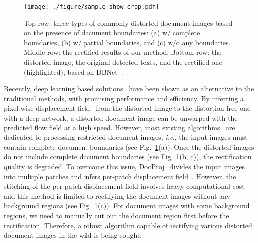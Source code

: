 \documentclass[lettersize,journal]{IEEEtran}
\begin{document}
\begin{figure}[t]
  \centering
  \texttt{[image: ./figure/sample\_show-crop.pdf]}
  \caption{Top row: three types of commonly distorted document images based on the presence of document boundaries: (a) w/ complete boundaries, (b) w/ partial boundaries, and (c) w/o any boundaries. Middle row: the rectified results of our method. Bottom row: the distorted image, the original detected texts, and the rectified one (highlighted), based on DBNet~\cite{liao2020real,CnSTD2023}.}
  \label{fig:doc_class}
  \vspace{-0.04in}
\end{figure}

Recently, deep learning based solutions~\cite{das2020intrinsic,9010747,das2021end,feng2021doctr,jiang2022revisiting,liu2020geometric,8578592,xie2021document,xie2020dewarping,xue2022fourier,feng2021docscanner,feng2022geometric,markovitz2020can,ma2022learning,zhang2022marior,li2019document} have been shown as an alternative to the traditional methods, with promising performance and efficiency.
By inferring a pixel-wise displacement field~\cite{teed2020raft} from the distorted image to the distortion-free one with a deep network, a distorted document image can be unwarped with the predicted flow field at a high speed.
However, most existing algorithms~\cite{das2020intrinsic,9010747,das2021end,feng2021doctr,jiang2022revisiting,liu2020geometric,8578592,xie2021document,xie2020dewarping,xue2022fourier,feng2021docscanner,feng2022geometric,markovitz2020can,zhang2022marior,ma2022learning} are dedicated to processing restricted document images, \emph{i.e.}, the input images must contain complete document boundaries (see Fig.~\ref{fig:doc_class}(a)). 
Once the distorted images do not include complete document boundaries (see Fig.~\ref{fig:doc_class}(b, c)), the rectification quality is degraded.
To overcome this issue, DocProj~\cite{li2019document} divides the input images into multiple patches and infers per-patch displacement field~\cite{teed2020raft}.
However, the stitching of the per-patch displacement field involves heavy computational cost~\cite{freedman2005interactive} and this method is limited to rectifying the document images without any background regions (see Fig.~\ref{fig:doc_class}(c)).
For document images with some background regions, we need to manually cut out the document region first before the rectification.
Therefore, a robust algorithm capable of rectifying various distorted document images in the wild is being sought.
\end{document}
